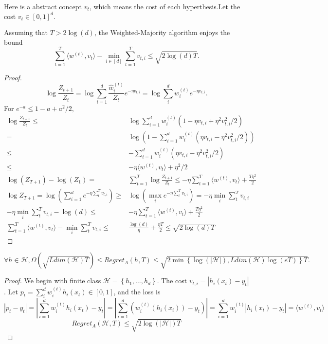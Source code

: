 Here is a abstract concept $ v_t $, which means the cost of each hyperthesis.Let the cost $ v_t \in {[0,1]}^d $.

\begin{theorem}
    Assuming that $ T > 2\log(d) $, the Weighted-Majority algorithm enjoys the bound
    \[
        \sum^{T}_{t=1} \langle w^{(t)}, v_t \rangle - \min_{i \in [d]} \sum^{T}_{t=1} v_{t,i} \le \sqrt{2\log(d) T}.
    \]
    \begin{proof}
        \[
            \log \frac{Z_{t+1}}{Z_t} = \log \sum^{d}_{i=1} \frac{\hat w ^{(t)}_i}{Z_t} e^{-\eta v_{t,i}} = \log \sum^{d}_{i} w^{(t)}_i e^{-\eta v_{t, i}}.
        \]
        For $ e^{-a} \le 1 - a + a^2/2 $,
        \begin{align*}
            \log \frac{Z_{t+1}}{Z_t} \le& \log \sum^{d}_{i=1} w^{(t)}_{i} \left( 1 - \eta v_{t, i} + \eta^2 v^2_{t,i}/2 \right)\\
            =& \log(1 - \sum^{d}_{i=1} w^{(t)}_i \left( \eta v_{t,i} - \eta^2 v^2_{t, i}/2 \right))\\
            \le& -\sum^{d}_{i=1} w^{(t)}_i \left( \eta v_{t,i} - \eta^2 v^2_{t, i}/2 \right)\\
            \le& -\eta \langle w^{(t)}, v_t \rangle + \eta^2/2\\
            \log(Z_{T+1}) - \log(Z_1) =& \sum^{T}_{t=1} \log \frac{Z_{t+1}}{Z_t} \le -\eta \sum^{T}_{t=1} \langle w^{(t)}, v_t \rangle + \frac{T \eta^2}{2} \\
            \log Z_{T+1} = \log \left( \sum^{d}_{i=1} e^{-\eta \sum^{T}_{t} v_{t, i} }\right) \ge& \log\left( \max_i e^{-\eta \sum^{T}_{t} v_{t, i}} \right) = -\eta\min_i \sum^{T}_{t} v_{t,i}\\
            -\eta\min_i \sum^{T}_{t} v_{t,i} - \log(d) \le& -\eta \sum^{T}_{t=1} \langle w^{(t)}, v_t \rangle + \frac{T \eta^2}{2} \\
            \sum^{T}_{t=1} \langle w^{(t)}, v_t \rangle - \min_i \sum^{T}_{t} v_{t,i} \le& \frac{\log(d)}{\eta} + \frac{\eta T}{2} \le \sqrt{2 \log(d) T}
        \end{align*}
    \end{proof}
\end{theorem}

\begin{theorem}
    \[
        \forall h \in \mathcal{H}, \Omega\left( \sqrt{Ldim(\mathcal{H})T} \right) \le Regret_{A}(h, T) \le \sqrt{2 \min \left\{ \log(\left| \mathcal{H} \right|), Ldim(\mathcal{H})\log(eT) \right\}T}.
    \]
\end{theorem}
\begin{proof}
    We begin with finite class $ \mathcal{H} = \left\{ h_1, \ldots, h_d \right\} $.
    The cost $ v_{t,i} = \left| h_i(x_t) - y_t \right| $. Let $ p_t = \sum^{d}_{i} w^{(t)}_{i} h_i (x_t) \in [0,1] $, and the loss is
    \[
        \left| p_t - y_t \right| = \left| \sum^{d}_{i=1} w^{(t)}_i h_i(x_t) - y_t \right| = \left| \sum^{d}_{i=1} (w^{(t)}_i (h_i(x_i)) - y_t) \right| =  \sum^{d}_{i=1}  w^{(t)}_i \left|h_i(x_t) - y_t \right| = \langle w^{(t)}, v_t \rangle
    \]
    \[
        Regret_A(\mathcal{H}, T) \le \sqrt{2 \log(\left| \mathcal{H} \right|)T}
    \]
\end{proof}

